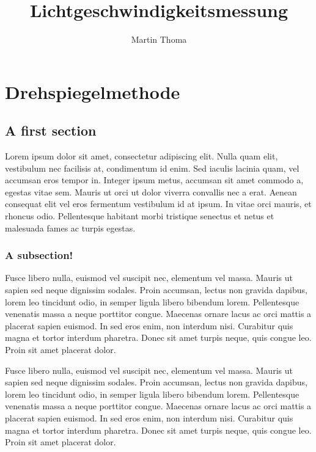 \documentclass[11pt,a4paper,oneside]{report}
\newcommand\yourName{Martin Thoma}
\newcommand\yourTitle{Lichtgeschwindigkeitsmessung}
\begin{document}
 \author{\yourName}
 \title{\yourTitle}

 \maketitle
 \tableofcontents

\chapter{Drehspiegelmethode}
\section{A first section}
Lorem ipsum dolor sit amet, consectetur adipiscing elit. Nulla quam 
elit, vestibulum nec facilisis at, condimentum id enim. Sed iaculis 
lacinia quam, vel accumsan eros tempor in. Integer ipsum metus, 
accumsan sit amet commodo a, egestas vitae sem. Mauris ut orci ut 
dolor viverra convallis nec a erat. Aenean consequat elit vel eros 
fermentum vestibulum id at ipsum. In vitae orci mauris, et rhoncus 
odio. Pellentesque habitant morbi tristique senectus et netus et 
malesuada fames ac turpis egestas.

\subsection{A subsection!}
Fusce libero nulla, euismod vel suscipit nec, elementum vel massa. 
Mauris ut sapien sed neque dignissim sodales. Proin accumsan, lectus 
non gravida dapibus, lorem leo tincidunt odio, in semper ligula 
libero bibendum lorem. Pellentesque venenatis massa a neque porttitor
congue. Maecenas ornare lacus ac orci mattis a placerat sapien 
euismod. In sed eros enim, non interdum nisi. Curabitur quis magna 
et tortor interdum pharetra. Donec sit amet turpis neque, quis congue
leo. Proin sit amet placerat dolor.

Fusce libero nulla, euismod vel suscipit nec, elementum vel massa. 
Mauris ut sapien sed neque dignissim sodales. Proin accumsan, lectus 
non gravida dapibus, lorem leo tincidunt odio, in semper ligula 
libero bibendum lorem. Pellentesque venenatis massa a neque porttitor
congue. Maecenas ornare lacus ac orci mattis a placerat sapien 
euismod. In sed eros enim, non interdum nisi. Curabitur quis magna 
et tortor interdum pharetra. Donec sit amet turpis neque, quis congue
leo. Proin sit amet placerat dolor.
\end{document}
